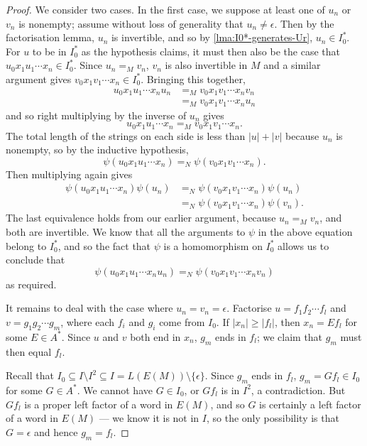 \documentclass[noindex,noinsetproof,12pt]{lmaths}
\begin{document}
\begin{proof}
	We consider two cases. In the first case, we suppose at least one of $u_n$ or $v_n$ is nonempty; assume without loss of generality that $u_n \ne \epsilon$. Then by the factorisation lemma, $u_n$ is invertible, and so by \cref{lma:I0*-generates-Ur}, $u_n \in I_0^*$. For $u$ to be in $I_0^*$ as the hypothesis claims, it must then also be the case that $u_0x_1u_1\cdots x_n \in I_0^*$. Since $u_n =_M v_n$, $v_n$ is also invertible in $M$ and a similar argument gives $v_0x_1v_1\cdots x_n \in I_0^*$. Bringing this together,
	\begin{align*}
		u_0x_1u_1 \cdots x_n u_n &=_M v_0x_1v_1\cdots x_n v_n \\
		&=_M v_0x_1v_1\cdots x_n u_n
	\end{align*}
	and so right multiplying by the inverse of $u_n$ gives
		\[ u_0x_1u_1 \cdots x_n =_M v_0x_1v_1\cdots x_n. \]
	The total length of the strings on each side is less than $|u| + |v|$ because $u_n$ is nonempty, so by the inductive hypothesis,
		\[ \psi(u_0x_1u_1 \cdots x_n) =_N \psi(v_0x_1v_1\cdots x_n). \]
	Then multiplying again gives
	\begin{align*}
		\psi(u_0x_1u_1 \cdots x_n)\psi(u_n) &=_N \psi(v_0x_1v_1\cdots x_n)\psi(u_n) \\
		&=_N \psi(v_0x_1v_1\cdots x_n)\psi(v_n).
	\end{align*}
	The last equivalence holds from our earlier argument, because $u_n =_M v_n$, and both are invertible. We know that all the arguments to $\psi$ in the above equation belong to $I_0^*$, and so the fact that $\psi$ is a homomorphism on $I_0^*$ allows us to conclude that
	\[ \psi(u_0x_1u_1 \cdots x_n u_n) =_N \psi(v_0 x_1 v_1 \cdots x_n v_n) \]
	as required.

	It remains to deal with the case where $u_n = v_n = \epsilon$. Factorise $u = f_1 f_2 \cdots f_l$ and $v = g_1 g_2 \cdots g_m$, where each $f_i$ and $g_i$ come from $I_0$. If $|x_n| \ge |f_l|$, then $x_n = Ef_l$ for some $E \in A^*$. Since $u$ and $v$ both end in $x_n$, $g_m$ ends in $f_l$; we claim that $g_m$ must then equal $f_l$.
	
	Recall that $I_0 \subseteq I \setminus I^2 \subseteq I = L(E(M)) \setminus \{\epsilon\}$.	Since $g_m$ ends in $f_l$, $g_m = Gf_l \in I_0$ for some $G \in A^*$. We cannot have $G \in I_0$, or $Gf_l$ is in $I^2$, a contradiction. But $Gf_l$ is a proper left factor of a word in $E(M)$, and so $G$ is certainly a left factor of a word in $E(M)$ --- we know it is not in $I$, so the only possibility is that $G = \epsilon$ and hence $g_m = f_l$.


\end{proof}
\end{document}
